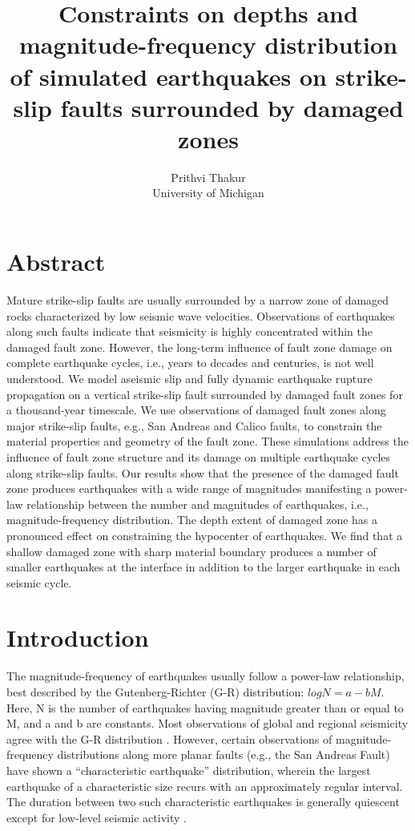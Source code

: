\documentclass[11pt]{article}
\newcommand{\yihe}[1]{{\color{red}#1}}
\begin{document}
\title{\textbf{Constraints on depths and magnitude-frequency distribution of simulated earthquakes on strike-slip faults surrounded by damaged zones}}
\author{Prithvi Thakur\\University of Michigan}

\maketitle

\doublespacing%
\section*{Abstract}
Mature strike-slip faults are usually surrounded by a narrow zone of damaged rocks characterized by low seismic wave velocities. Observations of earthquakes along such faults indicate that seismicity is highly concentrated within the damaged fault zone. \yihe{However, the long-term influence of fault zone damage on complete earthquake cycles, i.e., years to decades and centuries, is not well understood}. We model aseismic slip and fully dynamic earthquake rupture propagation on a \yihe{vertical} strike-slip fault surrounded by damaged fault zones for a thousand-year timescale. We use observations of damaged fault zones along major strike-slip faults, e.g., San Andreas and Calico faults, to constrain the material properties and geometry of the fault zone. These simulations address the influence of fault zone structure and its damage on multiple earthquake cycles along strike-slip faults. Our results show that the presence of the damaged fault zone produces earthquakes with a wide range of magnitudes manifesting a power-law relationship between the number and magnitudes of earthquakes, i.e., magnitude-frequency distribution. The depth extent of damaged zone has a pronounced effect on constraining the hypocenter of earthquakes. \yihe{We find that a shallow damaged zone with sharp material boundary produces a number of smaller earthquakes at the interface in addition to the larger earthquake in each seismic cycle.}

\section{Introduction}
The magnitude-frequency of earthquakes usually follow a power-law relationship, best described by the Gutenberg-Richter (G-R) distribution: $logN = a - bM$. Here, N is the number of earthquakes having magnitude greater than or equal to M, and a and b are constants. Most observations of global and regional seismicity agree with the G-R distribution \citep{page_felzer_2015, rundle_1989}. However, certain observations of magnitude-frequency distributions along more planar faults (e.g., the San Andreas Fault) have shown a “characteristic earthquake” distribution, wherein the largest earthquake of a characteristic size recurs with an approximately regular interval. The duration between two such characteristic earthquakes is generally quiescent except for low-level seismic activity \citep{schwartz_coppersmith_1984, wesnousky_1994}. 
\end{document}
